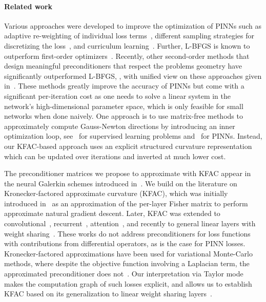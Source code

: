 \paragraph{Related work}
Various approaches were developed to improve the optimization of PINNs such as adaptive re-weighting of individual loss terms~\citep{wang2021understanding,van2022optimally,wang2022and}, different sampling strategies for discretizing the loss~\citep{lu2021deepxde, nabian2021efficient, daw2022rethinking,zapf2022investigating, wang2022respecting, wu2023comprehensive}, and curriculum learning~\citep{krishnapriyan2021characterizing, wang2022respecting}. 
Further, L-BFGS is known to outperform first-order optimizers~\citep{markidis2021old}. 
Recently, other second-order methods that design meaningful preconditioners that respect the problems geometry have significantly outperformed L-BFGS, \cite[see][]{zeng2022competitive, muller2023achieving, de2023operator, liu2024preconditioning, jnini2024gauss,chen2024teng, zampini2024petscml}, with unified view on these approaches given in~\citet{muller2024optimization}.
These methods greatly improve the accuracy of PINNs but come with a significant per-iteration cost as one needs to solve a linear system in the network's high-dimensional parameter space, which is only feasible for small networks when done naively.
One approach is to use matrix-free methods to approximately compute Gauss-Newton directions by introducing an inner optimization loop, see~\cite{schraudolph2002fast,martens2010deep} for supervised learning problems and~\cite{zeng2022competitive,bonfanti2024challenges, jnini2024gauss,zampini2024petscml} for PINNs.
Instead, our KFAC-based approach uses an explicit structured curvature representation which can be updated over iterations and inverted at much lower cost.

The preconditioner matrices we propose to approximate with KFAC appear in the neural Galerkin schemes introduced in~\citet{bruna2024neural}.
We build on the literature on Kronecker-factored approximate curvature (KFAC), which was initially introduced in~\citet{heskes2000natural,martens2010deep} as an approximation of the per-layer Fisher matrix to perform approximate natural gradient descent.
Later, KFAC was extended to convolutional~\citep{grosse2016kroneckerfactored}, recurrent~\citep{martens2018kroneckerfactored}, attention~\citep{zhang2019algorithmic,pauloski2021kaisa,osawa2023pipefisher,grosse2023studying}, and recently to general linear layers with weight sharing~\cite{eschenhagen2023kroneckerfactored}.
These works do not address preconditioners for loss functions with contributions from differential operators, as is the case for PINN losses.
Kronecker-factored approximations have been used for variational Monte-Carlo methods, where despite the objective function involving a Laplacian term, the approximated preconditioner does not~\citep{pfau2020ab,drissi2024second}.
Our interpretation via Taylor mode makes the computation graph of such losses explicit, and allows us to establish KFAC based on its generalization to linear weight sharing layers~\cite{eschenhagen2023kroneckerfactored}.

